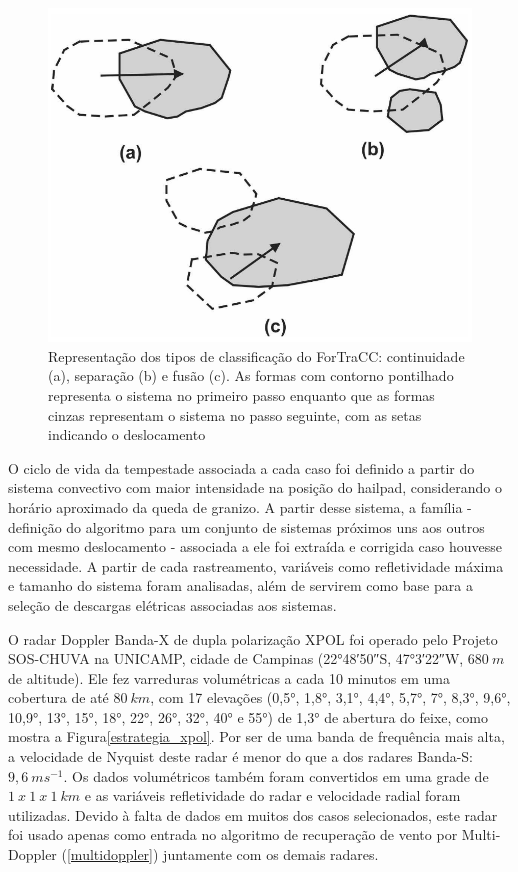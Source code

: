 \begin{figure}[htb]
	\begin{center}
		\caption{Representação dos tipos de classificação do ForTraCC: continuidade (a), separação (b) e fusão (c). As formas com contorno pontilhado representa o sistema no primeiro passo enquanto que as formas cinzas representam o sistema no passo seguinte, com as setas indicando o deslocamento} 
		\label{fortracc_teoria}
		\includegraphics[width=0.5\columnwidth]{figs/fortracc_classes.png}
	\end{center}
\end{figure}

O ciclo de vida da tempestade associada a cada caso foi definido a partir do sistema convectivo com maior intensidade na posição do hailpad, considerando o horário aproximado da queda de granizo. A partir desse sistema, a família - definição do algoritmo para um conjunto de sistemas próximos uns aos outros com mesmo deslocamento - associada a ele foi extraída e corrigida caso houvesse necessidade. A partir de cada rastreamento, variáveis como refletividade máxima e tamanho do sistema foram analisadas, além de servirem como base para a seleção de descargas elétricas associadas aos sistemas.

O radar Doppler Banda-X de dupla polarização XPOL foi operado pelo Projeto SOS-CHUVA na UNICAMP, cidade de Campinas (\ang{22;48;50}\:S, \ang{47;3;22}\:W, $680\:m$ de altitude). Ele fez varreduras volumétricas a cada 10 minutos em uma cobertura de até $80\:km$, com 17 elevações (\ang{0,5}, \ang{1,8}, \ang{3,1}, \ang{4,4}, \ang{5,7}, \ang{7}, \ang{8,3}, \ang{9,6}, \ang{10,9}, \ang{13}, \ang{15}, \ang{18}, \ang{22}, \ang{26}, \ang{32}, \ang{40} e \ang{55}) de \ang{1,3} de abertura do feixe, como mostra a Figura\autoref{estrategia_xpol}. Por ser de uma banda de frequência mais alta, a velocidade de Nyquist deste radar é menor do que a dos radares Banda-S: $9,6\:ms^{-1}$. Os dados volumétricos também foram convertidos em uma grade de $1\:x\:1\:x\:1\:km$ e as variáveis refletividade do radar e velocidade radial foram utilizadas. Devido à falta de dados em muitos dos casos selecionados, este radar foi usado apenas como entrada no algoritmo de recuperação de vento por Multi-Doppler (\autoref{multidoppler}) juntamente com os demais radares.

